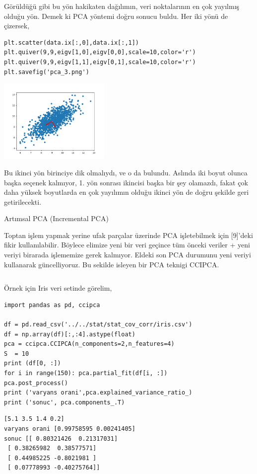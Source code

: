 \documentclass[12pt,fleqn]{article}\usepackage{../../common}
\begin{document}
Görüldüğü gibi bu yön hakikaten dağılımın, veri noktalarının en çok
yayılmış olduğu yön. Demek ki PCA yöntemi doğru sonucu buldu. Her iki
yönü de çizersek,

\begin{verbatim}
plt.scatter(data.ix[:,0],data.ix[:,1]) 
plt.quiver(9,9,eigv[1,0],eigv[0,0],scale=10,color='r') 
plt.quiver(9,9,eigv[1,1],eigv[0,1],scale=10,color='r')
plt.savefig('pca_3.png')
\end{verbatim}

\includegraphics[height=4cm]{pca_3.png}

Bu ikinci yön birinciye dik olmalıydı, ve o da bulundu. Aslında iki
boyut olunca başka seçenek kalmıyor, 1. yön sonrası ikincisi başka bir
şey olamazdı, fakat çok daha yüksek boyutlarda en çok yayılımın olduğu
ikinci yön de doğru şekilde geri getirilecekti.

Artımsal PCA (Incremental PCA)

Toptan işlem yapmak yerine ufak parçalar üzerinde PCA işletebilmek için
[9]'deki fikir kullanılabilir. Böylece elimize yeni bir veri geçince tüm
önceki veriler + yeni veriyi birarada işlememize gerek kalmıyor. Eldeki son
PCA durumunu yeni veriyi kullanarak güncelliyoruz. Bu sekilde isleyen bir
PCA teknigi CCIPCA. 

\inputminted[fontsize=\footnotesize]{python}{ccipca.py}

Örnek için Iris veri setinde görelim,

\begin{verbatim}
import pandas as pd, ccipca

df = pd.read_csv('../../stat/stat_cov_corr/iris.csv')
df = np.array(df)[:,:4].astype(float)
pca = ccipca.CCIPCA(n_components=2,n_features=4)
S  = 10
print (df[0, :])
for i in range(150): pca.partial_fit(df[i, :])
pca.post_process()
print ('varyans orani',pca.explained_variance_ratio_)
print ('sonuc', pca.components_.T)
\end{verbatim}

\begin{verbatim}
[5.1 3.5 1.4 0.2]
varyans orani [0.99758595 0.00241405]
sonuc [[ 0.80321426  0.21317031]
 [ 0.38265982  0.38577571]
 [ 0.44985225 -0.8021981 ]
 [ 0.07778993 -0.40275764]]
\end{verbatim}
\end{document}
